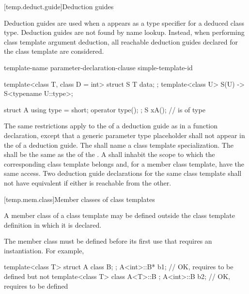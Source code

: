[temp.deduct.guide]{Deduction guides}
%

\pnum
Deduction guides are used
when a  appears
as a type specifier
for a deduced class type.
Deduction guides are not found by name lookup.
Instead, when performing class template argument deduction,
all reachable deduction guides declared for the class template are considered.

\begin{bnf}
\br
     template-name \terminal{(} parameter-declaration-clause \terminal{)} \terminal{->} simple-template-id \terminal{;}
\end{bnf}

\pnum
\begin{example}
\begin{codeblock}
template<class T, class D = int>
struct S {
  T data;
};
template<class U>
S(U) -> S<typename U::type>;

struct A {
  using type = short;
  operator type();
};
S x{A()};           //  is of type 
\end{codeblock}
\end{example}

\pnum
The same restrictions apply
to the 
of a deduction guide
as in a function declaration,
except that a generic parameter type placeholder
shall not appear in the  of
a deduction guide.
The 
shall name a class template specialization.
The 
shall be the same 
as the 
of the .
A 
shall inhabit the scope
to which the corresponding class template belongs
and, for a member class template, have the same access.
Two deduction guide declarations
for the same class template
shall not have equivalent 
if either is reachable from the other.

[temp.mem.class]{Member classes of class templates}

\pnum
A member class of a class template may be defined outside the class template
definition in which it is declared.
\begin{note}
The member class must be defined before its first use that requires
an instantiation.
For example,
\begin{codeblock}
template<class T> struct A {
  class B;
};
A<int>::B* b1;                          // OK, requires  to be defined but not 
template<class T> class A<T>::B { };
A<int>::B  b2;                          // OK, requires  to be defined
\end{codeblock}
\end{note}

